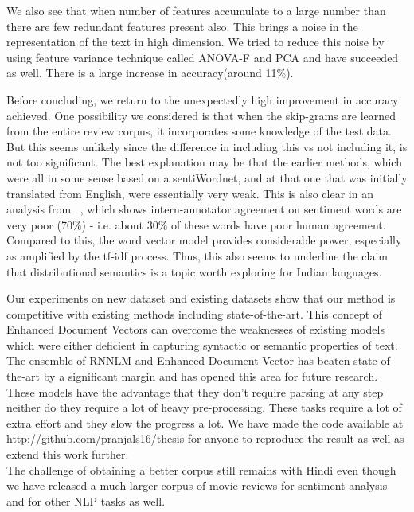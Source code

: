 \documentclass[11pt,a4paper]{article}
\begin{document}
We also see that when number of features accumulate to a large number than there are few redundant features present also. This brings a noise in the representation of the text in high dimension. We tried to reduce this noise by using feature variance technique called ANOVA-F and PCA and have succeeded as well. There is a large increase in accuracy(around 11\%).

Before concluding, we return to the unexpectedly high improvement in accuracy achieved. One possibility we considered is that when the skip-grams are learned from the entire review corpus, it incorporates some knowledge of the test data.  But this seems unlikely since the difference in including this vs not including it, is not too significant.  The best explanation may be that the earlier methods, which were all in some sense based on a sentiWordnet, and at that one that was initially translated from English, were essentially very weak.  This is also clear in an analysis from
~\cite{Bakliwal:12}, which shows intern-annotator agreement on sentiment words are very poor (70\%) - i.e. about 30\% of these words have poor human agreement. Compared to this, the word vector model  
provides considerable power, especially as amplified by the tf-idf process. Thus, this also seems to underline the claim that distributional semantics is a topic worth exploring for Indian languages.

Our experiments on new dataset and existing datasets show that our method is competitive with existing methods including state-of-the-art. This concept of Enhanced Document Vectors can overcome the weaknesses of existing models which were either deficient in capturing syntactic or semantic properties of text. The ensemble of RNNLM and Enhanced Document Vector has beaten state-of-the-art by a significant margin and has opened this area for future research. These models have the advantage that they don't require parsing at any step neither do they require a lot of heavy pre-processing. These tasks require a lot of extra effort and they slow the progress a lot. We have made the code available at \url{http://github.com/pranjals16/thesis} for anyone to reproduce the result as well as extend this work further.\\
The challenge of obtaining a better corpus still remains with Hindi even though we have released a much larger corpus of movie reviews for sentiment analysis and for other NLP tasks as well.
\end{document}
